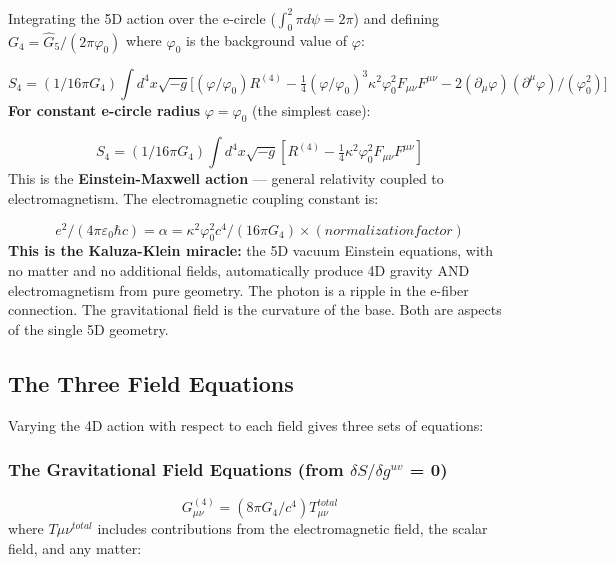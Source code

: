 \documentclass[aps,prd,preprint,superscriptaddress,longbibliography,floatfix]{revtex4-2}
\theoremstyle{remark}
\begin{document}
Integrating the 5D action over the e-circle ($\int_{0}^{2}\pi d\psi = 2\pi$) and defining $G_{4} = \hat{G}_{5} / (2\pi\varphi_{0})$ where $\varphi_{0}$ is the background value of $\varphi$:


\begin{equation}
    S_{4} = (1/16\pi G_{4}) \int d^{4}x \sqrt{-g} \bigl[ (\varphi/\varphi_{0}) R^{(4)} - \tfrac{1}{4}(\varphi/\varphi_{0})^{3} \kappa^{2}\varphi_{0}^{2} F_{\mu\nu}F^{\mu\nu} - 2(\partial_{\mu}\varphi)(\partial^{\mu}\varphi) / (\varphi_{0}^{2}) \bigr]
\end{equation}
\textbf{For constant e-circle radius} $\varphi = \varphi_{0}$ (the simplest case):


\begin{equation}
    S_{4} = (1/16\pi G_{4}) \int d^{4}x \sqrt{-g} \left[ R^{(4)} - \tfrac{1}{4}\kappa^{2}\varphi_{0}^{2} F_{\mu\nu}F^{\mu\nu} \right]
\end{equation}
This is the \textbf{Einstein-Maxwell action} --- general relativity coupled to electromagnetism. The electromagnetic coupling constant is:


\begin{equation}
    e^{2}/(4\pi\varepsilon_{0}\hbar c) = \alpha = \kappa^{2}\varphi_{0}^{2}c^{4}/(16\pi G_{4}) \times (normalization factor)
\end{equation}
\textbf{This is the Kaluza-Klein miracle:} the 5D vacuum Einstein equations, with no matter and no additional fields, automatically produce 4D gravity AND electromagnetism from pure geometry. The photon is a ripple in the e-fiber connection. The gravitational field is the curvature of the base. Both are aspects of the single 5D geometry.



\subsection{The Three Field Equations}

Varying the 4D action with respect to each field gives three sets of equations:


\subsubsection{The Gravitational Field Equations (from $\delta S/\delta g^{uv}$ = 0)}


\begin{equation}
    G_{\mu\nu}^{(4)} = (8\pi G_{4}/c^{4}) T_{\mu\nu}^{total}
\end{equation}
where $T\mu\nu^{total}$ includes contributions from the electromagnetic field, the scalar field, and any matter:
\end{document}
